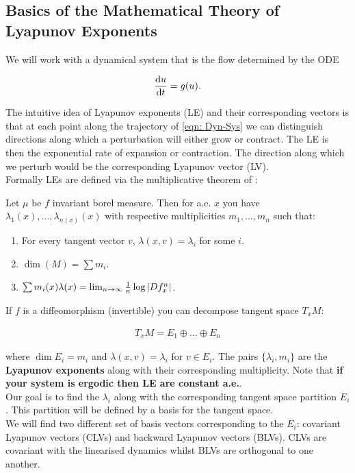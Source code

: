 \subsection{Basics of the Mathematical Theory of Lyapunov Exponents}

We will work with a dynamical system that is the flow determined by the ODE

\begin{align}
\dv{u}{t} = g(u). \label{eqn: Dyn-Sys}
\end{align}

The intuitive idea of Lyapunov exponents (LE) and their corresponding vectors is that at each point along the trajectory of \ref{eqn: Dyn-Sys} we can distinguish directions along which a perturbation will either grow or contract. The LE is then the exponential rate of expansion or contraction. The direction along which we perturb would be the corresponding Lyapunov vector (LV).\\

Formally LEs are defined via the multiplicative theorem of \cite{Oseledets1968}:

\begin{thm} \label{Oseldets}
Let $\mu$ be $f$ invariant borel measure. Then for a.e. $x$ you have $\lambda_1(x), \dots, \lambda_{n(x)}(x)$ with respective multiplicities $m_1, \dots, m_n$ such that:
\begin{enumerate}
\item For every tangent vector $v$, $\lambda(x,v) = \lambda_i$ for some $i$.\
\item $\dim(M) = \sum m_i$.\
\item $\sum m_i(x)\lambda(x) = \lim_{n \to \infty} \frac{1}{n} \log \abs{Df^n_x}$.
\end{enumerate}
\end{thm}

If $f$ is a diffeomorphism (invertible) you can decompose tangent space $T_x M$:

\begin{eqnarray}
T_x M = E_1 \oplus \dots \oplus E_n
\end{eqnarray}

where $\dim E_i = m_i$ and $\lambda(x,v) = \lambda_i$ for $v \in E_i$. The pairs $\{\lambda_i, m_i\}$ are the \textbf{Lyapunov exponents} along with their corresponding multiplicity. Note that \textbf{if your system is ergodic then LE are constant a.e.}.\\

Our goal is to find the $\lambda_i$ along with the corresponding tangent space partition $E_i$. This partition will be defined by a basis for the tangent space.\\

We will find two different set of basis vectors corresponding to the $E_i$: covariant Lyapunov vectors (CLVs) and backward Lyapunov vectors (BLVs). CLVs are covariant with the linearised dynamics whilst BLVs are orthogonal to one another.
